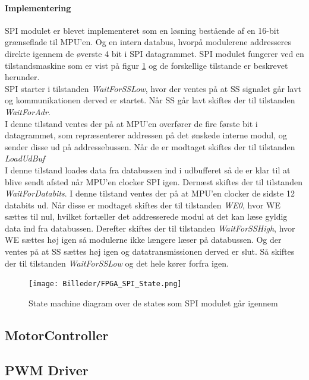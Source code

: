 \paragraph*{Implementering}
SPI modulet er blevet implementeret som en løsning bestående af en 16-bit grænseflade til MPU'en. Og en intern databus, hvorpå modulerene addresseres direkte igennem de øverste 4 bit i SPI datagrammet. SPI modulet fungerer ved en tilstandsmaskine som er vist på figur \ref{fig:FPGA_SPI_State} og de forskellige tilstande er beskrevet herunder. \\
SPI starter i tilstanden \textit{WaitForSSLow}, hvor der ventes på at SS signalet går lavt og kommunikationen derved er startet. Når SS går lavt skiftes der til tilstanden \textit{WaitForAdr}. \\ 
I denne tilstand ventes der på at MPU'en overfører de fire første bit i datagrammet, som repræsenterer addressen på det ønskede interne modul, og sender disse ud på addressebussen. Når de er modtaget skiftes der til tilstanden \textit{LoadUdBuf} \\
I denne tilstand loades data fra databussen ind i udbufferet så de er klar til at blive sendt afsted når MPU'en clocker SPI igen. Dernæst skiftes der til tilstanden \textit{WaitForDatabits}. I denne tilstand ventes der på at MPU'en clocker de sidste 12 databits ud. Når disse er modtaget skiftes der til tilstanden \textit{WE0}, hvor WE sættes til nul, hvilket fortæller det addresserede modul at det kan læse gyldig data ind fra databussen. Derefter skiftes der til tilstanden \textit{WaitForSSHigh}, hvor WE sættes høj igen så modulerne ikke længere læser på databussen. Og der ventes på at SS sættes høj igen og datatransmissionen derved er slut. Så skiftes der til tilstanden \textit{WaitForSSLow} og det hele kører forfra igen.

\begin{figure}[ht]
	\begin{center}
		\texttt{[image: Billeder/FPGA\_SPI\_State.png]}
	\end{center}
\caption{State machine diagram over de states som SPI modulet går igennem}
\label{fig:FPGA_SPI_State}
\end{figure}


\subsection{MotorController}

\subsection{PWM Driver}

